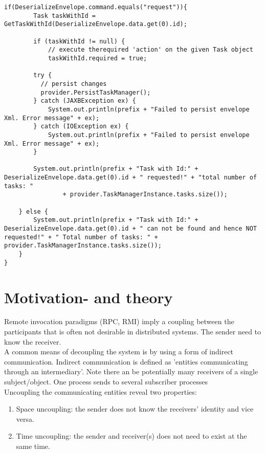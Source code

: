 \begin{lstlisting}[caption=receiver]
if(DeserializeEnvelope.command.equals("request")){
	    Task taskWithId = GetTaskWithId(DeserializeEnvelope.data.get(0).id);
		
	    if (taskWithId != null) {
		    // execute therequired 'action' on the given Task object
	      	taskWithId.required = true;
		
	    try {
		  // persist changes
		  provider.PersistTaskManager();
	    } catch (JAXBException ex) {
	        System.out.println(prefix + "Failed to persist envelope Xml. Error message" + ex);
	    } catch (IOException ex) {
	        System.out.println(prefix + "Failed to persist envelope Xml. Error message" + ex);
	    }
		
	    System.out.println(prefix + "Task with Id:" + DeserializeEnvelope.data.get(0).id + " requested!" + "total number of tasks: "
	            + provider.TaskManagerInstance.tasks.size());
		
	} else {
	    System.out.println(prefix + "Task with Id:" + DeserializeEnvelope.data.get(0).id + " can not be found and hence NOT requested!" + " Total number of tasks: " + provider.TaskManagerInstance.tasks.size());
	}
}
\end{lstlisting}





\section{Motivation- and theory}
\label{jgroup_motivation}
Remote invocation paradigms (RPC, RMI) imply a coupling between the participants that is often not desirable in distributed systems. The sender need to know the receiver. \\

 A common means of decoupling the system is by using a form of indirect communication. Indirect communication is defined as 'entities communicating through an intermediary'. Note there an be potentially many receivers of a single subject/object. One process sends to several subscriber processes\\

Uncoupling the communicating entities reveal two properties: 

\begin{enumerate}
\item Space uncoupling: the sender does not know the receivers' identity and vice versa. 
\item Time uncoupling: the sender and receiver(s) does not need to exist at the same time.  
\end{enumerate}

